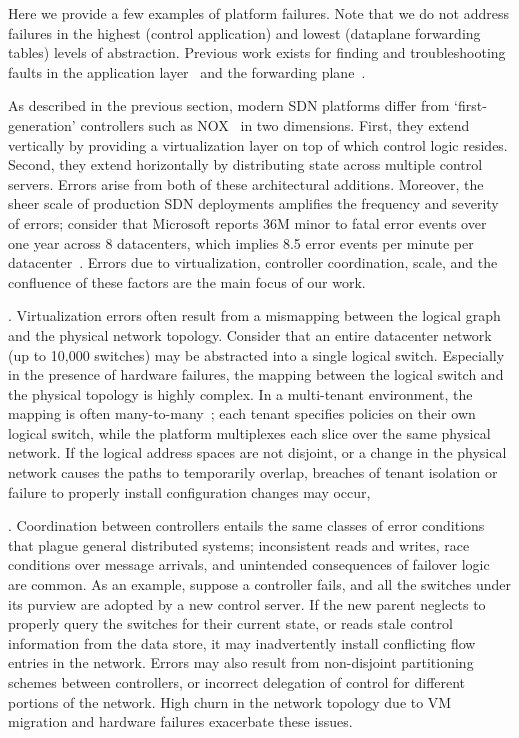 Here we provide a few examples of platform failures. Note that
we do not address failures in the highest (control application) and lowest
(dataplane forwarding tables) levels of abstraction. Previous work exists
for finding and troubleshooting faults in the application layer~\cite{nice}
and the forwarding plane~\cite{anteater}.

As described in the previous section, modern SDN platforms differ from
`first-generation' controllers such as NOX~\cite{nox} in two dimensions. 
First, they extend vertically by providing a virtualization layer on top of
which control logic resides. Second, they extend horizontally by
distributing state across multiple control servers. Errors arise from both of
these architectural additions. Moreover, the sheer scale of production
SDN deployments amplifies the
frequency and severity of errors; consider that Microsoft reports 36M 
minor to fatal error events over one year across 8 datacenters,
which implies 8.5 error events per minute per
datacenter~\cite{Greenberg:2009:VSF:1592568.1592576}. Errors due to virtualization,
controller coordination, scale, and the confluence of these factors are the main
focus of our work.

. Virtualization errors often result from a
mismapping between the logical
graph and the physical network topology. Consider that an entire datacenter
network (up to 10,000 switches) may be abstracted into a single logical switch. Especially in the
presence of hardware failures, the mapping between the logical switch and the
physical topology is highly complex. In a multi-tenant environment, the mapping is often
many-to-many~\cite{Casado:2010:VNF:1921151.1921162}; each tenant specifies
policies on their own logical switch, while the platform multiplexes each
slice over the same physical network. If the logical address
spaces are not disjoint, or a change in the physical network causes the paths
to temporarily overlap, breaches of tenant isolation or failure to properly
install configuration changes may occur,

. Coordination between controllers
entails the same classes of error
conditions that plague general distributed systems; inconsistent reads and
writes, race conditions over message arrivals, and unintended consequences of failover
logic are common. As an example, suppose a controller fails, and all the
switches under its purview are adopted by a new control server. If the new parent
neglects to properly query the switches for their current state, or reads
stale control information from the data store, it may inadvertently install
conflicting flow entries in the network. Errors may also result 
from non-disjoint partitioning
schemes between controllers, or incorrect delegation of control for different
portions of the network. 
High churn in the network topology due to VM migration and
hardware failures exacerbate these issues.

